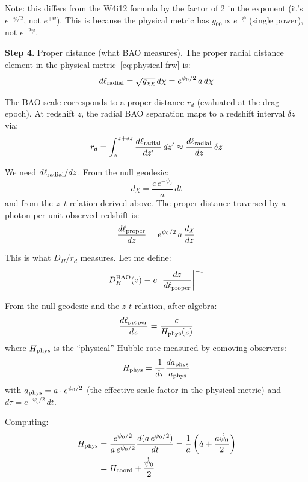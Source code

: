\documentclass[11pt,a4paper]{article}
\begin{document}
Note: this differs from the W4i12 formula by the factor of 2 in the
exponent (it's $e^{+\psi/2}$, not $e^{+\psi}$). This is because
the physical metric has $g_{00} \propto e^{-\psi}$ (single power),
not $e^{-2\psi}$.

\textbf{Step 4.} Proper distance (what BAO measures). The proper
radial distance element in the physical metric~\eqref{eq:physical-frw}
is:
\begin{equation}
d\ell_{\rm radial} = \sqrt{g_{\chi\chi}}\,d\chi = e^{\psi_0/2}\,a\,d\chi
\end{equation}

The BAO scale corresponds to a proper distance $r_d$ (evaluated at
the drag epoch). At redshift $z$, the radial BAO separation maps to
a redshift interval $\delta z$ via:
\begin{equation}
r_d = \int_z^{z+\delta z} \frac{d\ell_{\rm radial}}{dz'}\,dz'
\approx \frac{d\ell_{\rm radial}}{dz}\,\delta z
\end{equation}

We need $d\ell_{\rm radial}/dz$. From the null geodesic:
\begin{equation}
d\chi = \frac{c\,e^{-\psi_0}}{a}\,dt
\end{equation}
and from the $z$--$t$ relation derived above. The proper distance
traversed by a photon per unit observed redshift is:
\begin{equation}
\frac{d\ell_{\rm proper}}{dz} = e^{\psi_0/2}\,a\,\frac{d\chi}{dz}
\end{equation}

This is what $D_H/r_d$ measures. Let me define:
\begin{equation}
D_H^{\rm BAO}(z) \equiv c\,\left|\frac{dz}{d\ell_{\rm proper}}\right|^{-1}
\end{equation}

From the null geodesic and the $z$-$t$ relation, after algebra:
\begin{equation}
\frac{d\ell_{\rm proper}}{dz} = \frac{c}{H_{\rm phys}(z)}
\end{equation}
where $H_{\rm phys}$ is the ``physical'' Hubble rate measured by
comoving observers:
\begin{equation}
H_{\rm phys} = \frac{1}{d\tau}\frac{da_{\rm phys}}{a_{\rm phys}}
\end{equation}
with $a_{\rm phys} = a \cdot e^{\psi_0/2}$ (the effective scale factor
in the physical metric) and $d\tau = e^{-\psi_0/2}\,dt$.

Computing:
\begin{align}
H_{\rm phys} &= \frac{e^{\psi_0/2}}{a\,e^{\psi_0/2}}
\frac{d(a\,e^{\psi_0/2})}{dt}
= \frac{1}{a}\left(\dot{a} + \frac{a\dot{\psi}_0}{2}\right) \nonumber\\
&= H_{\rm coord} + \frac{\dot{\psi}_0}{2}
\label{eq:H-physical}
\end{align}
\end{document}

